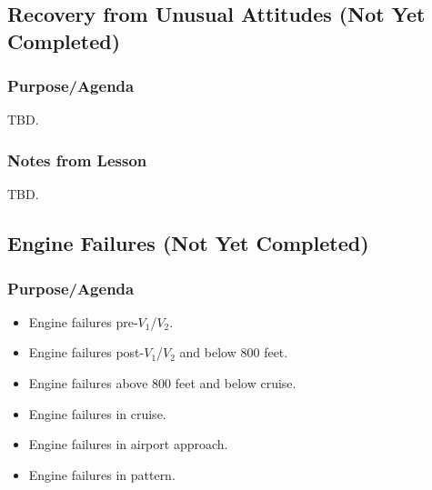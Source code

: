 \documentclass[letterpaper,10pt,titlepage]{article}
\begin{document}
\subsection{Recovery from Unusual Attitudes (Not Yet Completed)}
\label{sfle0:srua0}



\subsubsection{Purpose/Agenda}
\label{sfle0:srua0:spov0}

TBD.


\subsubsection{Notes from Lesson}
\label{sfle0:srua0:snff0}

TBD.



\subsection{Engine Failures (Not Yet Completed)}
\label{sfle0:sefa0}



\subsubsection{Purpose/Agenda}
\label{sfle0:sefa0:spov0}

\begin{itemize}
\item Engine failures pre-$V_1$/$V_2$.
\item Engine failures post-$V_1$/$V_2$ and below 800 feet.
\item Engine failures above 800 feet and below cruise.
\item Engine failures in cruise.
\item Engine failures in airport approach.
\item Engine failures in pattern.
\end{itemize}

\end{document}
